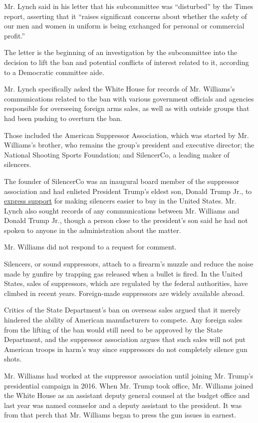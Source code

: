 Mr. Lynch said in his letter that his subcommittee was ``disturbed'' by
the Times report, asserting that it ``raises significant concerns about
whether the safety of our men and women in uniform is being exchanged
for personal or commercial profit.''

The letter is the beginning of an investigation by the subcommittee into
the decision to lift the ban and potential conflicts of interest related
to it, according to a Democratic committee aide.

Mr. Lynch specifically asked the White House for records of Mr.
Williams's communications related to the ban with various government
officials and agencies responsible for overseeing foreign arms sales, as
well as with outside groups that had been pushing to overturn the ban.

Those included the American Suppressor Association, which was started by
Mr. Williams's brother, who remains the group's president and executive
director; the National Shooting Sports Foundation; and SilencerCo, a
leading maker of silencers.

The founder of SilencerCo was an inaugural board member of the
suppressor association and had enlisted President Trump's eldest son,
Donald Trump Jr., to \href{https://youtu.be/0vlu2G5UkXk}{express
support} for making silencers easier to buy in the United States. Mr.
Lynch also sought records of any communications between Mr. Williams and
Donald Trump Jr., though a person close to the president's son said he
had not spoken to anyone in the administration about the matter.

Mr. Williams did not respond to a request for comment.

Silencers, or sound suppressors, attach to a firearm's muzzle and reduce
the noise made by gunfire by trapping gas released when a bullet is
fired. In the United States, sales of suppressors, which are regulated
by the federal authorities, have climbed in recent years. Foreign-made
suppressors are widely available abroad.

Critics of the State Department's ban on overseas sales argued that it
merely hindered the ability of American manufacturers to compete. Any
foreign sales from the lifting of the ban would still need to be
approved by the State Department, and the suppressor association argues
that such sales will not put American troops in harm's way since
suppressors do not completely silence gun shots.

Mr. Williams had worked at the suppressor association until joining Mr.
Trump's presidential campaign in 2016. When Mr. Trump took office, Mr.
Williams joined the White House as an assistant deputy general counsel
at the budget office and last year was named counselor and a deputy
assistant to the president. It was from that perch that Mr. Williams
began to press the gun issues in earnest.

